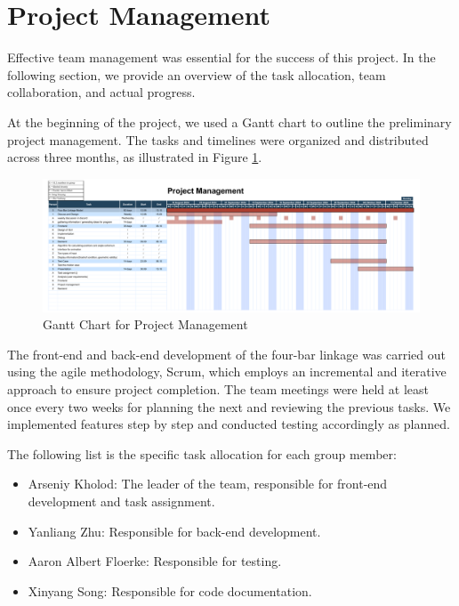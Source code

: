 \documentclass{article}
\begin{document}
\section{Project Management} \label{ch:projectmanagement}

Effective team management was essential for the success of this project. In the following section, we provide an overview of the task allocation, team collaboration, and actual progress.

At the beginning of the project, we used a Gantt chart to outline the preliminary project management. The tasks and timelines were organized and distributed across three months, as illustrated in Figure \ref{fig:project_management_gantt_chart}.

\begin{figure}[h]
	\centering
	\includegraphics[width=\textwidth]{./figures/project_management_gantt_chart.pdf}
	\caption{Gantt Chart for Project Management}
	\label{fig:project_management_gantt_chart}
\end{figure}

The front-end and back-end development of the four-bar linkage was carried out using the agile methodology, Scrum, which employs an incremental and iterative approach to ensure project completion. The team meetings were held at least once every two weeks for planning the next and reviewing the previous tasks. We implemented features step by step and conducted testing accordingly as planned.

The following list is the specific task allocation for each group member:

\begin{itemize}
    \item Arseniy Kholod: The leader of the team, responsible for front-end development and task assignment.
    \item Yanliang Zhu: Responsible for back-end development.
    \item Aaron Albert Floerke: Responsible for testing.
    \item Xinyang Song: Responsible for code documentation.
\end{itemize}
\end{document}

